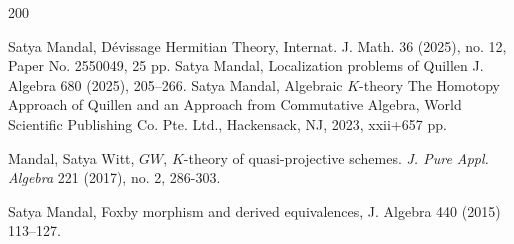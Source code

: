 \documentclass[12pt]{article}
\begin{document}
\begin{thebibliography}{200}





%



 Satya Mandal, D\'{e}vissage Hermitian Theory, 
Internat. J. Math. 36 (2025), no. 12, Paper No. 2550049, 25 pp.
%
 Satya Mandal, Localization problems of Quillen
J. Algebra 680 (2025), 205–266.
 Satya Mandal, 
Algebraic $K$-theory
The Homotopy Approach of Quillen and an Approach from Commutative Algebra,
World Scientific Publishing Co. Pte. Ltd., Hackensack, NJ, 2023, xxii+657 pp.
% 

 
 
 
  Mandal, Satya Witt, $GW$, $K$-theory of quasi-projective schemes. {\it J. Pure Appl. Algebra} 221 (2017), no. 2, 286-303. 
 
 Satya Mandal, Foxby morphism and derived equivalences, J. Algebra 440 (2015) 113–127.

 
 

\end{thebibliography}
\end{document}
